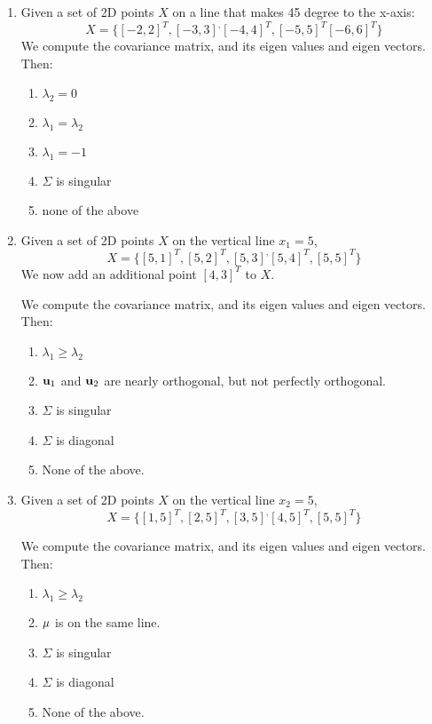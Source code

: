 \documentclass{article}
\begin{document}
\begin{enumerate}
      \item Given a set of 2D points $X$ on a line that makes 45 degree to the x-axis:
    \[ X = \{  [-2,2]^T, [-3,3]^, [-4,4]^T, [-5,5]^T [-6,6]^T \}\]
    We compute the covariance matrix, and its eigen values and eigen vectors. Then:

    \begin{enumerate}
        \item  $\lambda_2 = 0$
        \item  $\lambda_1 = \lambda_2$
        \item  $\lambda_1 = -1$
        \item  $\Sigma$ is singular
        \item none of the above
    \end{enumerate}

    \item Given a set of 2D points $X$ on the vertical line $x_1=5$,
     \[ X = \{ [5,1]^T, [5,2]^T, [5,3]^, [5,4]^T, [5,5]^T \}\]
    We now add an additional
    point $[4,3]^T$ to $X$.

    We compute the covariance matrix, and its eigen values and eigen vectors. Then:


    \begin{enumerate}
        \item $\lambda_1 \geq \lambda_2$
        \item ${\bf u}_1$ and ${\bf u}_2$ are nearly orthogonal, but not perfectly orthogonal.
        \item  $\Sigma$ is singular
        \item  $\Sigma$ is diagonal
        \item None of the above.
    \end{enumerate}


    \item Given a set of 2D points $X$ on the vertical line $x_2=5$,
     \[ X = \{ [1,5]^T, [2,5]^T, [3,5]^, [4,5]^T, [5,5]^T \}\]


    We compute the covariance matrix, and its eigen values and eigen vectors. Then:


    \begin{enumerate}
        \item $\lambda_1 \geq \lambda_2$
        \item ${\bf \mu}$ is on the same line.
        \item  $\Sigma$ is singular
        \item  $\Sigma$ is diagonal
        \item None of the above.
    \end{enumerate}


\end{enumerate}
\end{document}
